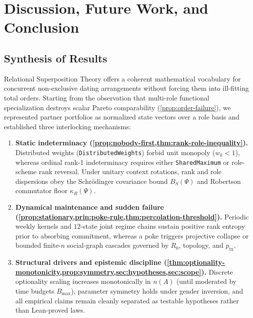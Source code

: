 \section{Discussion, Future Work, and Conclusion}
\label{sec:discussion}

\subsection{Synthesis of Results}
\label{subsec:disc-synthesis}

Relational Superposition Theory offers a coherent mathematical vocabulary for
concurrent non-exclusive dating arrangements without forcing them into
ill-fitting total orders. Starting from the observation that multi-role
functional specialization destroys scalar Pareto comparability (\cref{prop:order-failure}),
we represented partner portfolios as normalized state vectors over a role basis
and established three interlocking mechanisms:
\begin{enumerate}[nosep]
  \item \textbf{Static indeterminacy (\cref{prop:nobody-first,thm:rank-role-inequality}).}
        Distributed weights (\textnormal{\texttt{DistributedWeights}}) forbid unit monopoly
        ($w_k < 1$), whereas ordinal rank-1 indeterminacy requires either
        \textnormal{\texttt{SharedMaximum}} or role-scheme rank reversal. Under unitary context
        rotations, rank and role dispersions obey the Schr\"odinger covariance bound
        $B_S(\Psi)$ and Robertson commutator floor $\kappa_R(\Psi)$.
  \item \textbf{Dynamical maintenance and sudden failure (\cref{prop:stationary,prin:poke-rule,thm:percolation-threshold}).}
        Periodic weekly kernels and $12$-state joint regime chains sustain positive rank
        entropy prior to absorbing commitment, whereas a poke triggers projective collapse
        or bounded finite-$n$ social-graph cascades governed by $R_0$, topology, and $p_{\mathrm{tx}}$.
  \item \textbf{Structural drivers and epistemic discipline (\cref{thm:optionality-monotonicity,prop:symmetry,sec:hypotheses,sec:scope}).}
        Discrete optionality scaling increases monotonically in $n(A)$ (until moderated by
        time budgets $B_{\max}$), parameter symmetry holds under gender inversion, and
        all empirical claims remain cleanly separated as testable hypotheses rather than
        Lean-proved laws.
\end{enumerate}

